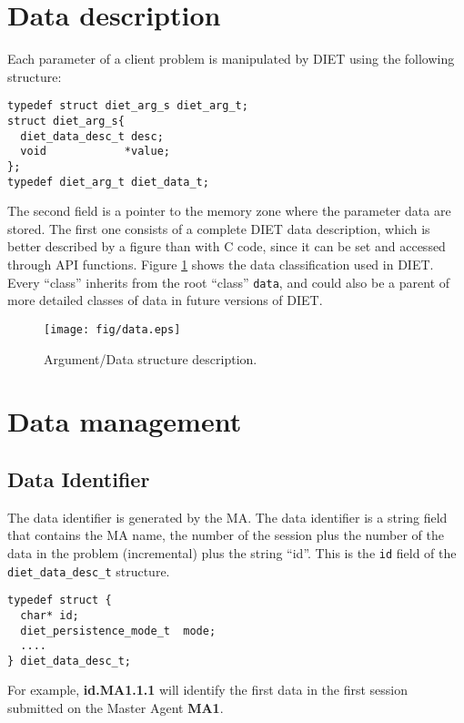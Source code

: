 \section{Data description}
\label{sec:datadesc}

Each parameter of a client problem is manipulated by DIET using the following
structure:
{\footnotesize
\begin{verbatim}
typedef struct diet_arg_s diet_arg_t;
struct diet_arg_s{
  diet_data_desc_t desc;
  void            *value;
};
typedef diet_arg_t diet_data_t;
\end{verbatim}
}

The second field is a pointer to the memory zone where the parameter data are
stored. The first one consists of a complete DIET data description, which is
better described by a figure than with C code, since it can be set and accessed
through API functions. Figure \ref{fig:data} shows the data classification used
in DIET. Every ``class'' inherits from the root ``class'' \texttt{data}, and
could also be a parent of more detailed classes of data in future versions of
DIET.

\begin{figure}[hpt]
 \begin{center}
  \texttt{[image: fig/data.eps]}
  \caption{Argument/Data structure description.}
  \label{fig:data}
 \end{center}
\end{figure}


\section{Data management}
\label{sec:datamgt}

\subsection{Data Identifier}
\label{ssec:dataid}
The data identifier is generated by the MA. The data identifier is a
string field that contains the MA name, the number of the session plus
the number of the data in the problem (incremental) plus the string
``id''.  This is the \texttt{id} field of the
\texttt{diet\_data\_desc\_t} structure.

{\footnotesize
\begin{verbatim}
typedef struct {
  char* id;  
  diet_persistence_mode_t  mode;
  ....
} diet_data_desc_t;
\end{verbatim}
}

For example, \textbf{id.MA1.1.1} will identify the first data
in the first session submitted on the Master Agent \textbf{MA1}.


